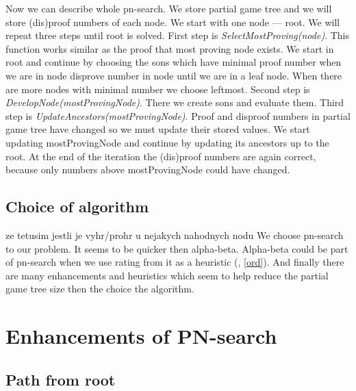 Now we can describe whole pn-search. We store partial game tree and we will
store (dis)proof numbers of each node. We start with one node --- root. We will
repeat three steps until root is solved. First step is
\emph{SelectMostProving(node)}. This function works similar as the proof that
most proving node exists.  We start in root and continue by
choosing the sons which have minimal proof number when we are in 
node disprove number in  node until we are in a leaf node. When there
are more nodes with minimal number we choose leftmost. Second step is
\emph{DevelopNode(mostProvingNode)}. There we create sons and evaluate them.
Third step is \emph{UpdateAncestors(mostProvingNode)}. Proof and disproof
numbers in partial game tree have changed so we must update their stored
values. We start updating mostProvingNode and continue by updating its
ancestors up to the root. At the end of the iteration the (dis)proof numbers
are again correct, because only numbers above mostProvingNode could have
changed.


\subsection{Choice of algorithm}

ze tetusim jestli je vyhr/prohr u nejakych nahodnych nodu
We choose pn-search to our problem. It seems to be quicker then alpha-beta.  Alpha-beta
could be part of pn-search when we use rating from it as a heuristic (, \ref{ord}).
And finally there are many enhancements and heuristics which seem to help reduce the partial game tree size  
then the choice the algorithm.

\section{Enhancements of PN-search}


\subsection{Path from root}

